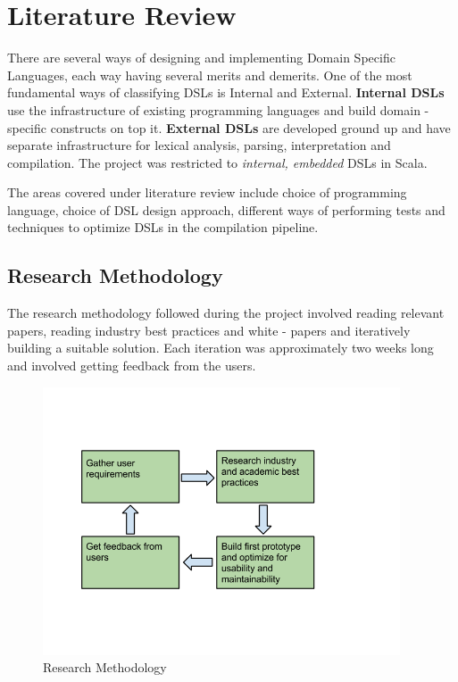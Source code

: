 \section{Literature Review}
There are several ways of designing and implementing Domain Specific Languages, each way having several merits and demerits. One of the most fundamental ways of classifying DSLs is Internal and External. \textbf{Internal DSLs} use the infrastructure of existing programming languages and build domain - specific constructs on top it. \textbf{External DSLs} are developed ground up and have separate infrastructure for lexical analysis, parsing, interpretation and compilation. The project was restricted to \textit{internal, embedded} DSLs in Scala.
\bigskip

\noindent
The areas covered under literature review include choice of programming language, choice of DSL design approach, different ways of performing tests and techniques to optimize DSLs in the compilation pipeline.
\bigskip

\subsection{Research Methodology}

The research methodology followed during the project involved reading relevant papers, reading industry best practices and white - papers and iteratively building a suitable solution. Each iteration was approximately two weeks long and involved getting feedback from the users.

\begin{figure}[H]
  \centering
    \includegraphics[height=300px]{figures/research.png}
  \caption{Research Methodology}
\end{figure}

